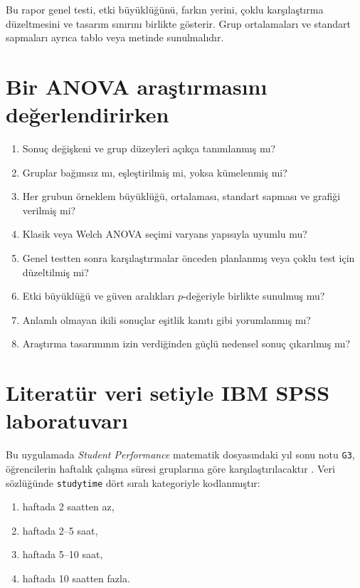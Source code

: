 Bu rapor genel testi, etki büyüklüğünü, farkın yerini, çoklu karşılaştırma
düzeltmesini ve tasarım sınırını birlikte gösterir. Grup ortalamaları ve
standart sapmaları ayrıca tablo veya metinde sunulmalıdır.

\section{Bir ANOVA araştırmasını değerlendirirken}

\begin{enumerate}
  \item Sonuç değişkeni ve grup düzeyleri açıkça tanımlanmış mı?
  \item Gruplar bağımsız mı, eşleştirilmiş mi, yoksa kümelenmiş mi?
  \item Her grubun örneklem büyüklüğü, ortalaması, standart sapması ve grafiği verilmiş mi?
  \item Klasik veya Welch ANOVA seçimi varyans yapısıyla uyumlu mu?
  \item Genel testten sonra karşılaştırmalar önceden planlanmış veya çoklu test için düzeltilmiş mi?
  \item Etki büyüklüğü ve güven aralıkları $p$-değeriyle birlikte sunulmuş mu?
  \item Anlamlı olmayan ikili sonuçlar eşitlik kanıtı gibi yorumlanmış mı?
  \item Araştırma tasarımının izin verdiğinden güçlü nedensel sonuç çıkarılmış mı?
\end{enumerate}

\section{Literatür veri setiyle IBM SPSS laboratuvarı}

Bu uygulamada \emph{Student Performance} matematik dosyasındaki yıl sonu
notu \texttt{G3}, öğrencilerin haftalık çalışma süresi gruplarına göre
karşılaştırılacaktır \cite{cortez2008data,cortezsilva2008}. Veri sözlüğünde
\texttt{studytime} dört sıralı kategoriyle kodlanmıştır:

\begin{enumerate}
  \item haftada 2 saatten az,
  \item haftada 2--5 saat,
  \item haftada 5--10 saat,
  \item haftada 10 saatten fazla.
\end{enumerate}

